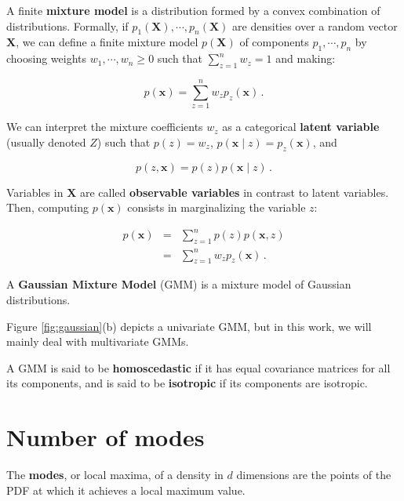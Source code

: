 A finite \textbf{mixture model} is a distribution formed by a convex combination of distributions. Formally, if $p_1(\mathbf{X}), \cdots, p_n(\mathbf{X})$ are densities over a random vector $\mathbf{X}$, we can define a finite mixture model $p(\mathbf{X})$ of components $p_1, \cdots, p_n$ by choosing weights $w_1, \cdots, w_n \geq 0$ such that $\sum_{z=1}^n w_z = 1$ and making:

\begin{equation}
  p(\mathbf{x}) = \sum_{z=1}^n w_z p_z(\mathbf{x}) \, .
\end{equation}

We can interpret the mixture coefficients $w_z$ as a categorical \textbf{latent variable} (usually denoted $Z$) such that $p(z) = w_z$, $p(\mathbf{x} \mid z) = p_z(\mathbf{x})$, and

\begin{equation}
  p(z, \mathbf{x}) = p(z) p(\mathbf{x} \mid z) \, .
\end{equation}

\noindent Variables in $\mathbf{X}$ are called \textbf{observable variables} in contrast to latent variables. Then, computing $p(\mathbf{x})$ consists in marginalizing the variable $z$:

\begin{eqnarray}
  p(\mathbf{x}) & = & \sum_{z=1}^n p(z) p(\mathbf{x}, z) \\
  & = & \sum_{z=1}^n w_z p_z(\mathbf{x}) \, .
\end{eqnarray}

\begin{definition}
  A \textbf{Gaussian Mixture Model} (GMM) is a mixture model of Gaussian distributions.
\end{definition}

\noindent Figure \ref{fig:gaussian}(b) depicts a univariate GMM, but in this work, we will mainly deal with multivariate GMMs.

A GMM is said to be \textbf{homoscedastic} if it has equal covariance matrices for all its components, and is said to be \textbf{isotropic} if its components are isotropic.

\section{Number of modes}
\label{sec:gmm:nmodes}

The \textbf{modes}, or local maxima, of a density in $d$ dimensions are the points of the PDF at which it achieves a local maximum value.

